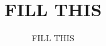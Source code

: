 \documentclass[12pt, a4paper]{article}
\title{FILL THIS}
\author{FILL THIS}
\begin{document}
	
\maketitle
 
 
 
 
 
 
 
 


\nocite{*} %


\end{document}
